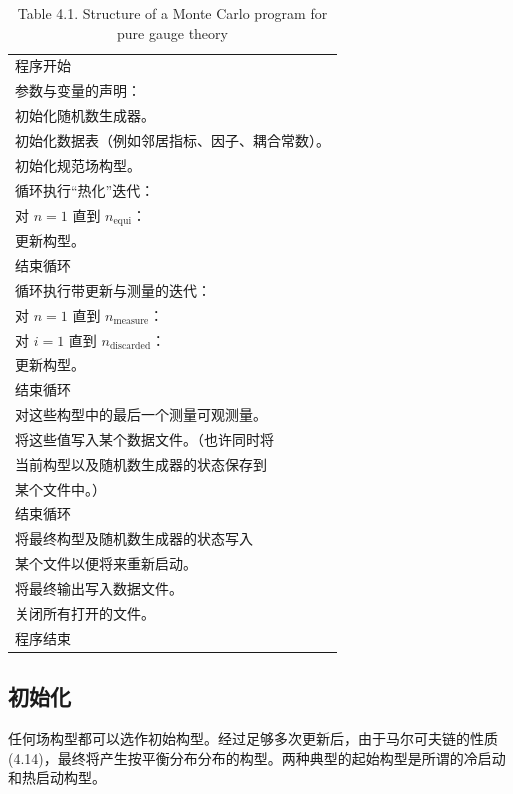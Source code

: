 \begin{table}[htbp]
  \centering
  \caption*{Table 4.1. Structure of a Monte Carlo program for pure gauge theory}
  \label{tab:41}
  \begin{tabular}{@{}p{}@{}}
    \ttfamily
    程序开始\\
    参数与变量的声明：\\
    \quad 初始化随机数生成器。\\
    \quad 初始化数据表（例如邻居指标、因子、耦合常数）。\\
    \quad 初始化规范场构型。\\
    循环执行“热化”迭代：\\
    \quad 对 $n = 1$ 直到 $n_\mathrm{equi}$：\\
    \quad\quad 更新构型。\\
    \quad 结束循环\\
    循环执行带更新与测量的迭代：\\
    \quad 对 $n = 1$ 直到 $n_\mathrm{measure}$：\\
    \quad\quad 对 $i = 1$ 直到 $n_\mathrm{discarded}$：\\
    \quad\quad\quad 更新构型。\\
    \quad\quad 结束循环\\
    \quad\quad 对这些构型中的最后一个测量可观测量。\\
    \quad\quad 将这些值写入某个数据文件。（也许同时将\\
    \quad\quad\quad 当前构型以及随机数生成器的状态保存到\\
    \quad\quad\quad 某个文件中。）\\
    \quad 结束循环\\
    将最终构型及随机数生成器的状态写入\\
    \quad 某个文件以便将来重新启动。\\
    将最终输出写入数据文件。\\
    关闭所有打开的文件。\\
    程序结束
  \end{tabular}
\end{table}

\subsection{初始化}

任何场构型都可以选作初始构型。经过足够多次更新后，由于马尔可夫链的性质 (4.14)，最终将产生按平衡分布分布的构型。两种典型的起始构型是所谓的冷启动和热启动构型。

